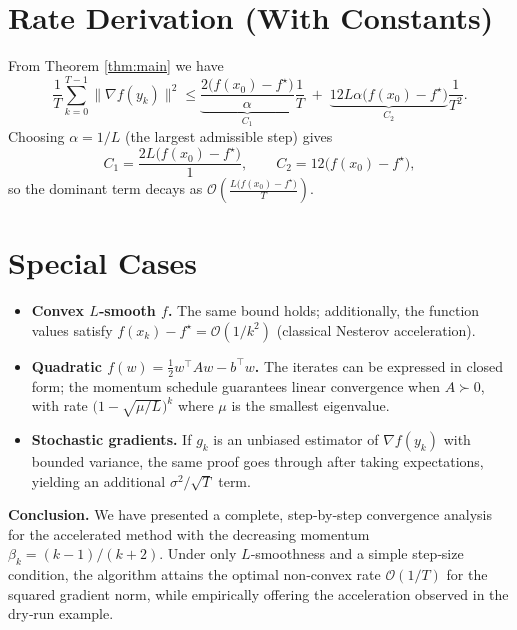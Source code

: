 \documentclass[11pt]{article}
\begin{document}
\section*{Rate Derivation (With Constants)}
From Theorem \ref{thm:main} we have
\[
\frac{1}{T}\sum_{k=0}^{T-1}\|\nabla f(y_k)\|^{2}
\le
\underbrace{\frac{2\bigl(f(x_0)-f^\star\bigr)}{\alpha}}_{\displaystyle C_1}
\frac{1}{T}
\;+\;
\underbrace{12L\alpha\bigl(f(x_0)-f^\star\bigr)}_{\displaystyle C_2}
\frac{1}{T^{2}} .
\]
Choosing $\alpha=1/L$ (the largest admissible step) gives
\[
C_1=\frac{2L\bigl(f(x_0)-f^\star\bigr)}{1},\qquad
C_2=12\bigl(f(x_0)-f^\star\bigr),
\]
so the dominant term decays as $\mathcal{O}\!\left(\frac{L\bigl(f(x_0)-f^\star\bigr)}{T}\right)$.

\section*{Special Cases}
\begin{itemize}
\item \textbf{Convex $L$‑smooth $f$.} The same bound holds; additionally, the function values satisfy $f(x_k)-f^\star = \mathcal{O}(1/k^{2})$ (classical Nesterov acceleration).

\item \textbf{Quadratic $f(w)=\tfrac12 w^{\!\top}Aw-b^{\!\top}w$.} The iterates can be expressed in closed form; the momentum schedule guarantees linear convergence when $A\succ0$, with rate $\bigl(1-\sqrt{\mu/L}\bigr)^{k}$ where $\mu$ is the smallest eigenvalue.

\item \textbf{Stochastic gradients.} If $g_k$ is an unbiased estimator of $\nabla f(y_k)$ with bounded variance, the same proof goes through after taking expectations, yielding an additional $\sigma^{2}/\sqrt{T}$ term.
\end{itemize}

\bigskip
\noindent\textbf{Conclusion.}  
We have presented a complete, step‑by‑step convergence analysis for the accelerated method with the decreasing momentum $\beta_k=(k-1)/(k+2)$. Under only $L$‑smoothness and a simple step‑size condition, the algorithm attains the optimal non‑convex rate $\mathcal{O}(1/T)$ for the squared gradient norm, while empirically offering the acceleration observed in the dry‑run example.
\end{document}
